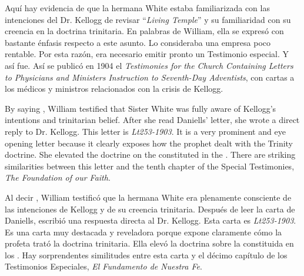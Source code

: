 Aquí hay evidencia de que la hermana White estaba familiarizada con las intenciones del Dr. Kellogg de revisar “\textit{Living Temple}” y su familiaridad con su creencia en la doctrina trinitaria. En palabras de William, ella se expresó con bastante énfasis respecto a este asunto. Lo consideraba una empresa poco rentable. Por esta razón, era necesario emitir pronto un Testimonio especial. Y así fue. Así se publicó en 1904 el \textit{Testimonies for the Church Containing Letters to Physicians and Ministers Instruction to Seventh-Day Adventists}, con cartas a los médicos y ministros relacionados con la crisis de Kellogg.


By saying , William testified that Sister White was fully aware of Kellogg's intentions and trinitarian belief. After she read Daniells’ letter, she wrote a direct reply to Dr. Kellogg. This letter is \textit{Lt253-1903}. It is a very prominent and eye opening letter because it clearly exposes how the prophet dealt with the Trinity doctrine. She elevated the doctrine on the  constituted in the . There are striking similarities between this letter and the tenth chapter of the Special Testimonies, \textit{The Foundation of our Faith}.


Al decir , William testificó que la hermana White era plenamente consciente de las intenciones de Kellogg y de su creencia trinitaria. Después de leer la carta de Daniells, escribió una respuesta directa al Dr. Kellogg. Esta carta es \textit{Lt253-1903}. Es una carta muy destacada y reveladora porque expone claramente cómo la profeta trató la doctrina trinitaria. Ella elevó la doctrina sobre la  constituida en los . Hay sorprendentes similitudes entre esta carta y el décimo capítulo de los Testimonios Especiales, \textit{El Fundamento de Nuestra Fe}.






